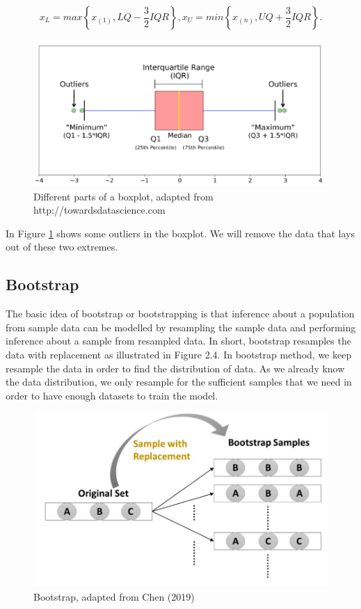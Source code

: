 \begin{equation}
\label{eq:boxplot}
x_{L}=max\left \{ x_{(1)},LQ - \frac{3}{2} IQR\right \},
x_{U}=min\left \{ x_{(n)},UQ + \frac{3}{2} IQR\right \}.
\end{equation}

\begin{figure}[h]
	\centering
	\includegraphics[width=1\textwidth]{images/boxplot.png}
	\caption{Different parts of a boxplot, adapted from http://towardsdatascience.com}
	\label{Boxplot}
\end{figure}
In Figure \ref{Boxplot} shows some outliers in the boxplot. We will remove the data that lays out of these two extremes.

\subsection{Bootstrap}

The basic idea of bootstrap or bootstrapping is that inference about a population from sample data can be modelled by resampling the sample data and performing inference about a sample from resampled data. In short, bootstrap resamples the data with replacement as illustrated in Figure 2.4. In bootstrap method, we keep resample the data in order to find the distribution of data. As we already know the data distribution, we only resample for the sufficient samples that we need in order to have enough datasets to train the model.  

\begin{figure}[h]
	\flushleft
	\includegraphics[width=1\textwidth]{images/bootstrap.png}
	\begin{flushright}
		\caption{Bootstrap, adapted from Chen (2019)}
	\end{flushright}
	\label{Bootstrap}
\end{figure}


